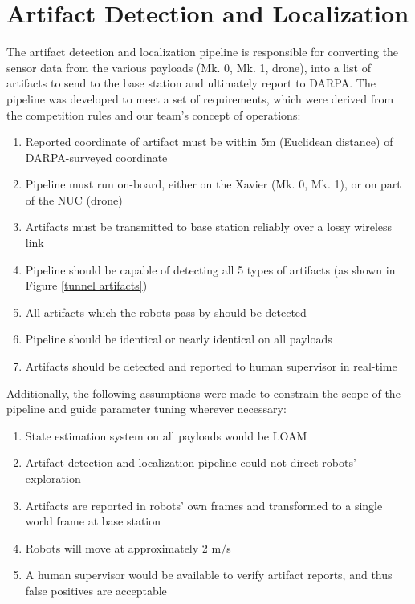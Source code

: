 \chapter{Artifact Detection and Localization}

The artifact detection and localization pipeline is responsible for converting the sensor data from the various payloads (Mk. 0, Mk. 1, drone), into a list of artifacts to send to the base station and ultimately report to DARPA. The pipeline was developed to meet a set of requirements, which were derived from the competition rules and our team's concept of operations:

\begin{enumerate}
	\item Reported coordinate of artifact must be within 5m (Euclidean distance) of DARPA-surveyed coordinate
	\item Pipeline must run on-board, either on the Xavier (Mk. 0, Mk. 1), or on part of the NUC (drone)
	\item Artifacts must be transmitted to base station reliably over a lossy wireless link
	\item Pipeline should be capable of detecting all 5 types of artifacts (as shown in Figure \ref{tunnel artifacts})
	\item All artifacts which the robots pass by should be detected
	\item Pipeline should be identical or nearly identical on all payloads
	\item Artifacts should be detected and reported to human supervisor in real-time
\end{enumerate}

Additionally, the following assumptions were made to constrain the scope of the pipeline and guide parameter tuning wherever necessary:

\begin{enumerate}
	\item State estimation system on all payloads would be LOAM
	\item Artifact detection and localization pipeline could not direct robots' exploration
	\item Artifacts are reported in robots' own frames and transformed to a single world frame at base station
	\item Robots will move at approximately 2 m/s
	\item A human supervisor would be available to verify artifact reports, and thus false positives are acceptable
\end{enumerate}

